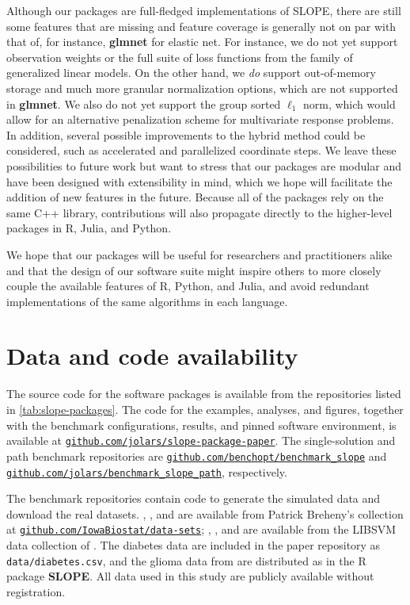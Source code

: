 \documentclass[a4paper,fleqn]{cas-sc}
\newcommand{\myurl}[1]{\href{https://#1}{\nolinkurl{#1}}}
\begin{document}
Although our packages are full-fledged implementations of SLOPE, there are still
some features that are missing and feature coverage is generally not on par with
that of, for instance, \textbf{glmnet} for elastic net. For instance, we do not
yet support observation weights or the full suite of loss functions from the
family of generalized linear models. On the other hand, we \emph{do} support
out-of-memory storage and much more granular normalization options, which are
not supported in \textbf{glmnet}. We also do not yet support the group sorted
\(\ell_1\) norm, which would allow for an alternative penalization scheme for
multivariate response problems. In addition, several possible improvements to
the hybrid method could be considered, such as accelerated and parallelized
coordinate steps. We leave these possibilities to future work but want to stress
that our packages are modular and have been designed with extensibility in mind,
which we hope will facilitate the addition of new features in the future.
Because all of the packages rely on the same \textsf{C++} library, contributions
will also propagate directly to the higher-level packages in \textsf{R},
\textsf{Julia}, and \textsf{Python}.

We hope that our packages will be useful for researchers and practitioners alike
and that the design of our software suite might inspire others to more closely
couple the available features of \textsf{R}, \textsf{Python}, and
\textsf{Julia}, and avoid redundant implementations of the same algorithms in
each language.

\section*{Data and code availability}

The source code for the software packages is available from the repositories
listed in \autoref{tab:slope-packages}. The code for the examples, analyses, and
figures, together with the benchmark configurations, results, and pinned
software environment, is available at
\myurl{github.com/jolars/slope-package-paper}. The single-solution and path
benchmark repositories are \myurl{github.com/benchopt/benchmark\_slope} and
\myurl{github.com/jolars/benchmark\_slope\_path}, respectively.

The benchmark repositories contain code to generate the simulated data and
download the real datasets. , , and
 are available from Patrick Breheny's collection at
\myurl{github.com/IowaBiostat/data-sets}; , ,
and  are available from the LIBSVM data collection of
\citet{chang2016}. The diabetes data are included in the paper repository as
\texttt{data/diabetes.csv}, and the glioma data from \citet{Godlewski2023} are
distributed as  in the \textsf{R} package \textbf{SLOPE}. All
data used in this study are publicly available without registration.
\end{document}
